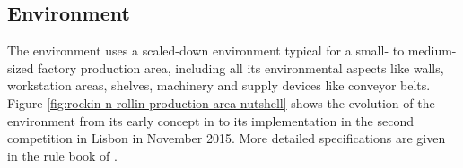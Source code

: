 \subsection{\erlir Environment}

The \erlir environment uses a scaled-down environment typical for a small- to medium-sized factory production area, including all its environmental aspects like walls, workstation areas, shelves, machinery and supply devices like conveyor belts. 
Figure \ref{fig:rockin-n-rollin-production-area-nutshell} shows the evolution of the \erlir environment from its early concept in \roaw to its implementation in the second \roaw competition in Lisbon in November 2015. More detailed specifications are given in the rule book of \erlir.\\

